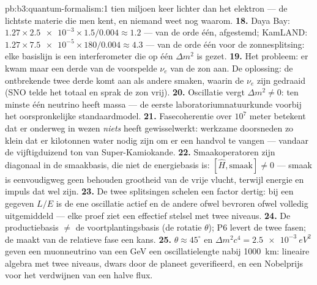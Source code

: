 \begin{solution}{pb:b3:quantum-formalism:1}
tien miljoen keer lichter dan het elektron --- de lichtste materie die
men kent, en niemand weet nog waarom.
\textbf{18.} Daya Bay: $1.27 \times \num{2.5e-3} \times 1.5/0.004
\approx 1.2$ --- van de orde één, afgestemd; KamLAND: $1.27 \times
\num{7.5e-5} \times 180/0.004 \approx 4.3$ --- van de orde één voor de
zonnesplitsing: elke basislijn is een interferometer die op één
$\Delta m^2$ is gezet.
\textbf{19.} Het probleem: er kwam maar een derde van de voorspelde
$\nu_e$ van de zon aan. De oplossing: de ontbrekende twee derde komt aan
als andere smaken, waarin de $\nu_e$ zijn gedraaid (SNO telde het totaal
en sprak de zon vrij).
\textbf{20.} Oscillatie vergt $\Delta m^2 \neq 0$: ten minste één
neutrino heeft massa --- de eerste laboratoriumnatuurkunde voorbij het
oorspronkelijke standaardmodel.
\textbf{21.} Fasecoherentie over $10^7$ meter betekent dat er onderweg in
wezen \emph{niets} heeft gewisselwerkt: werkzame doorsneden zo klein dat
er kilotonnen water nodig zijn om er een handvol te vangen --- vandaar de
vijftigduizend ton van Super-Kamiokande.
\textbf{22.} Smaakoperatoren zijn diagonaal in de smaakbasis, die niet de
energiebasis is: $[\hat H, \text{smaak}] \neq 0$ --- smaak is
eenvoudigweg geen behouden grootheid van de vrije vlucht, terwijl energie
en impuls dat wel zijn.
\textbf{23.} De twee splitsingen schelen een factor dertig: bij een
gegeven $L/E$ is de ene oscillatie actief en de andere ofwel bevroren
ofwel volledig uitgemiddeld --- elke proef ziet een effectief stelsel met
twee niveaus.
\textbf{24.} De productiebasis $\neq$ de voortplantingsbasis (de rotatie
$\theta$); P6 levert de twee fasen; de  maakt van de
relatieve fase een kans.
\textbf{25.} $\theta \approx 45^\circ$ en $\Delta m^2c^4 =
\qty{2.5e-3}{eV^2}$ geven een muonneutrino van een GeV een
oscillatielengte nabij \qty{1000}{km}: lineaire algebra met twee niveaus,
dwars door de planeet geverifieerd, en een Nobelprijs voor het verdwijnen
van een halve flux.
\end{solution}
